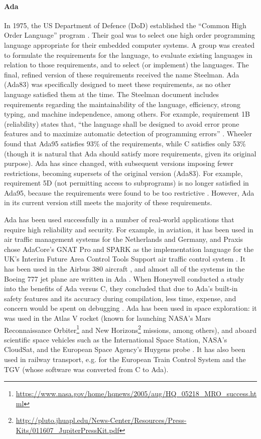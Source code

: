 \paragraph{Ada}
In 1975, the US Department of Defence (DoD) established the ``Common High Order Language'' program \cite{wheeler1997}.
Their goal was to select one high order programming language appropriate for their embedded computer systems.
A group was created to formulate the requirements for the language, to evaluate existing languages in relation to those requirements, and to select (or implement) the languages.
The final, refined version of these requirements received the name Steelman.
Ada (Ada83) was specifically designed to meet these requirements, as no other language satisfied them at the time.
The Steelman document includes requirements regarding the maintainability of the language, efficiency, strong typing, and machine independence, among others.
For example, requirement 1B (reliability) states that, ``the language shall be designed to avoid error prone features and to maximize automatic detection of programming errors'' \cite{wheeler1997}.
Wheeler found that Ada95 satisfies 93\% of the requirements, while C satisfies only 53\% (though it is natural that Ada should satisfy more requirements, given its original purpose).
Ada has since changed, with subsequent versions imposing fewer restrictions, becoming supersets of the original version (Ada83).
For example, requirement 5D (not permitting access to subprograms) is no longer satisfied in Ada95, because the requirements were found to be too restrictive \cite{wheeler1997}.
However, Ada in its current version still meets the majority of these requirements.

Ada has been used successfully in a number of real-world applications that require high reliability and security.
For example, in aviation, it has been used in air traffic management systems for the Netherlands and Germany, and Praxis chose AdaCore's GNAT Pro and SPARK as the implementation language for the UK's Interim Future Area Control Tools Support air traffic control system \cite{adacore2007}.
It has been used in the Airbus 380 aircraft \cite{feldman2014}, and almost all of the systems in the Boeing 777 jet plane are written in Ada \cite{adaicBoeing}.
When Honeywell conducted a study into the benefits of Ada versus C, they concluded that due to Ada's built-in safety features and its accuracy during compilation, less time, expense, and concern would be spent on debugging \cite{adaicBoeing}.
Ada has been used in space exploration: it was used in the Atlas V rocket (known for launching NASA's Mars Reconnaissance Orbiter\footnote{\url{https://www.nasa.gov/home/hqnews/2005/aug/HQ_05218_MRO_success.html}} and New Horizons\footnote{\url{http://pluto.jhuapl.edu/News-Center/Resources/Press-Kits/011607_JupiterPressKit.pdf}} missions, among others), and aboard scientific space vehicles such as the International Space Station, NASA's CloudSat, and the European Space Agency's Huygens probe \cite{feldman2014}.
It has also been used in railway transport, e.g. for the European Train Control System and the TGV (whose software was converted from C to Ada).

